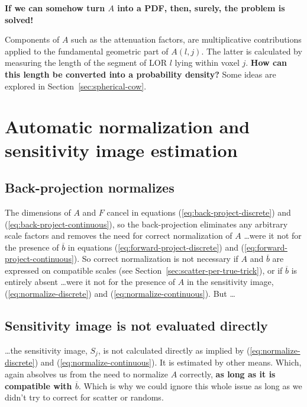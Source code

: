 \documentclass[10pt, a4paper, twocolumn]{article} %
\begin{document}
\textbf{If we can somehow turn \(A\) into a PDF, then, surely, the problem is
  solved!}

Components of \(A\) such as the attenuation factors, are multiplicative
contributions applied to the fundamental geometric part of \(A(l,j)\). The
latter is calculated by measuring the length of the segment of LOR \(l\) lying
within voxel \(j\). \textbf{How can this length be converted into a probability
  density?} Some ideas are explored in Section~\ref{sec:spherical-cow}.


\section{Automatic normalization and sensitivity image estimation}

\subsection{Back-projection normalizes}\label{sec:back-projection-normalizes}

The dimensions of \(A\) and \(F\) cancel in equations
(\ref{eq:back-project-discrete}) and (\ref{eq:back-project-continuous}), so the
back-projection eliminates any arbitrary scale factors and removes the need for
correct normalization of \(A\) \ldots were it not for the presence of
\(\overline{b}\) in equations (\ref{eq:forward-project-discrete}) and
(\ref{eq:forward-project-continuous}). So correct normalization is not necessary
if \(A\) and \(\overline{b}\) are expressed on compatible scales (see
Section~\ref{sec:scatter-per-true-trick}), or if \(\overline{b}\) is entirely
absent \ldots were it not for the presence of \(A\) in the sensitivity image,
(\ref{eq:normalize-discrete}) and (\ref{eq:normalize-continuous}). But \ldots

\subsection{Sensitivity image is not evaluated directly}

\ldots the sensitivity image, \(S_{j}\), is not calculated directly as implied
by (\ref{eq:normalize-discrete}) and (\ref{eq:normalize-continuous}). It is
estimated by other means. Which, again absolves us from the need to normalize
\(A\) correctly, \textbf{as long as it is compatible with \(\overline{b}\)}.
Which is why we could ignore this whole issue as long as we didn't try to
correct for scatter or randoms.
\end{document}
